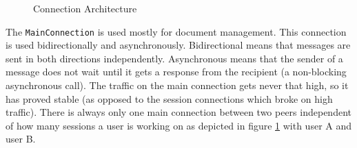 \begin{figure}[H]
 \centering
 \caption{Connection Architecture}
 \label{fig:network.discovery.connection.architecture}
\end{figure}


The \texttt{MainConnection} is used mostly for document management. This connection is used bidirectionally and asynchronously. Bidirectional means that messages are sent in both directions independently. Asynchronous means that the sender of a message does not wait until it gets a response from the recipient (a non-blocking asynchronous call). The traffic on the main connection gets never that high, so it has proved stable (as opposed to the session connections which broke on high traffic). There is always only one main connection between two peers independent of how many sessions a user is working on as depicted in figure \ref{fig:network.discovery.connection.architecture} with user A and user B.

